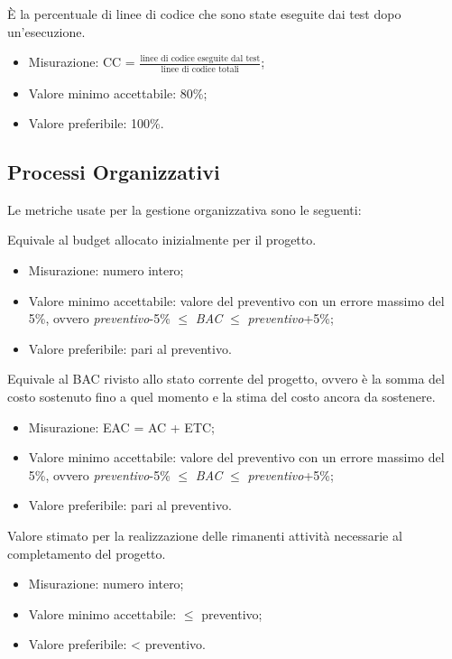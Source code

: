 		 È la percentuale di linee di codice che sono state eseguite dai test dopo un’esecuzione.
		 \begin{itemize}
			\item{Misurazione: CC = $\displaystyle\frac{\mbox{linee di codice eseguite dal test}}{\mbox{linee di codice totali}}$;}
			\item{Valore minimo accettabile: 80\%;}
			\item{Valore preferibile: 100\%.}
		\end{itemize}

\subsection{Processi Organizzativi}

	Le metriche usate per la gestione organizzativa sono le seguenti:
	
		Equivale al budget allocato inizialmente per il progetto.
		\begin{itemize}
			\item{Misurazione: numero intero;}
			\item{Valore minimo accettabile: valore del preventivo con un errore massimo del 5\%, ovvero \textit{preventivo}-5\% $\leq$ \textit{BAC} $\leq$ \textit{preventivo}+5\%;}
			\item{Valore preferibile: pari al preventivo.}
		\end{itemize}
		
		Equivale al BAC rivisto allo stato corrente del progetto, ovvero è la somma del costo sostenuto fino a quel momento e la stima del costo ancora da sostenere.
		\begin{itemize}
			\item{Misurazione: EAC = AC + ETC;}
			\item{Valore minimo accettabile: valore del preventivo con un errore massimo del 5\%, ovvero \textit{preventivo}-5\% $\leq$ \textit{BAC} $\leq$ \textit{preventivo}+5\%;}
			\item{Valore preferibile: pari al preventivo.}
		\end{itemize}
		
		Valore stimato per la realizzazione delle rimanenti attività necessarie al completamento del progetto.
		\begin{itemize}
			\item{Misurazione: numero intero;}
			\item{Valore minimo accettabile: $\leq$ preventivo;}
			\item{Valore preferibile: < preventivo.}
		\end{itemize}
		
